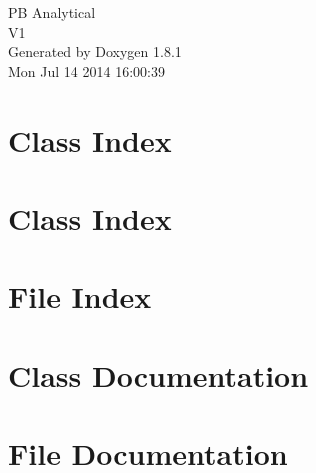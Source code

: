 \documentclass{book}
\begin{document}
\hypersetup{pageanchor=false,citecolor=blue}
\begin{titlepage}
\vspace*{7cm}
\begin{center}
{\Large P\-B Analytical \\[1ex]\large V1 }\\
\vspace*{1cm}
{\large Generated by Doxygen 1.8.1}\\
\vspace*{0.5cm}
{\small Mon Jul 14 2014 16:00:39}\\
\end{center}
\end{titlepage}
\clearemptydoublepage
{}
\tableofcontents
\clearemptydoublepage
{}
\hypersetup{pageanchor=true,citecolor=blue}
\chapter{Class Index}

\chapter{Class Index}

\chapter{File Index}

\chapter{Class Documentation}

















\chapter{File Documentation}

























\printindex
\end{document}

